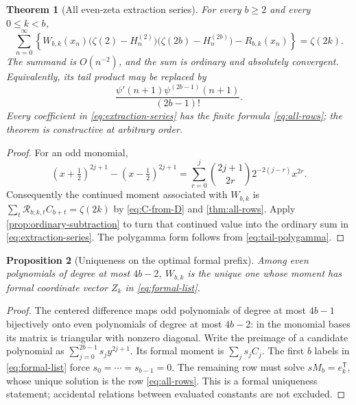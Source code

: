 \documentclass[11pt,letterpaper]{article}
\newtheorem{theorem}{Theorem}[section]
\newtheorem{proposition}[theorem]{Proposition}
\theoremstyle{definition}
\theoremstyle{remark}
\numberwithin{equation}{section}
\begin{document}
\begin{theorem}[All even-zeta extraction series]
\label{thm:extraction-series}
For every $b\geq2$ and every $0\leq k<b$,
\begin{equation}\label{eq:extraction-series}
 \boxed{\displaystyle
 \sum_{n=0}^{\infty}
  \left\{W_{b,k}(x_n)
    \bigl(\zeta(2)-H_n^{(2)}\bigr)
    \bigl(\zeta(2b)-H_n^{(2b)}\bigr)-R_{b,k}(x_n)\right\}
 =\zeta(2k).}
\end{equation}
The summand is $O(n^{-2})$, and the sum is ordinary and absolutely
convergent. Equivalently, its tail product may be replaced by
\begin{equation}\label{eq:extraction-polygamma}
 \frac{\psi'(n+1)\psi^{(2b-1)}(n+1)}{(2b-1)!}.
\end{equation}
Every coefficient in \eqref{eq:extraction-series} has the finite formula
\eqref{eq:all-rows}; the theorem is constructive at arbitrary order.
\end{theorem}
\begin{proof}
For an odd monomial,
\[
 (x+\tfrac12)^{2j+1}-(x-\tfrac12)^{2j+1}
 =\sum_{r=0}^j\binom{2j+1}{2r}2^{-2(j-r)}x^{2r}.
\]
Consequently the continued moment associated with $W_{b,k}$ is
$\sum_t\mathcal R_{b;k,t}C_{b+t}=\zeta(2k)$ by
\eqref{eq:C-from-D} and \cref{thm:all-rows}. Apply
\cref{prop:ordinary-subtraction} to turn that continued value into
the ordinary sum in \eqref{eq:extraction-series}. The polygamma
form follows from \eqref{eq:tail-polygamma}.
\end{proof}

\begin{proposition}[Uniqueness on the optimal formal prefix]
\label{prop:filter-unique}
Among even polynomials of degree at most $4b-2$, $W_{b,k}$ is the
unique one whose moment has formal coordinate vector $Z_k$ in
\eqref{eq:formal-list}.
\end{proposition}
\begin{proof}
The centered difference maps odd polynomials of degree at most
$4b-1$ bijectively onto even polynomials of degree at most $4b-2$:
in the monomial bases its matrix is triangular with nonzero diagonal.
Write the preimage of a candidate polynomial as
$\sum_{j=0}^{2b-1}s_jy^{2j+1}$. Its formal moment is
$\sum_js_jC_j$. The first $b$ labels in \eqref{eq:formal-list}
force $s_0=\cdots=s_{b-1}=0$. The remaining row must solve
$sM_b=e_k^{\mathsf T}$, whose unique solution is the row
\eqref{eq:all-rows}. This is a formal uniqueness statement; accidental
relations between evaluated constants are not excluded.
\end{proof}
\end{document}
